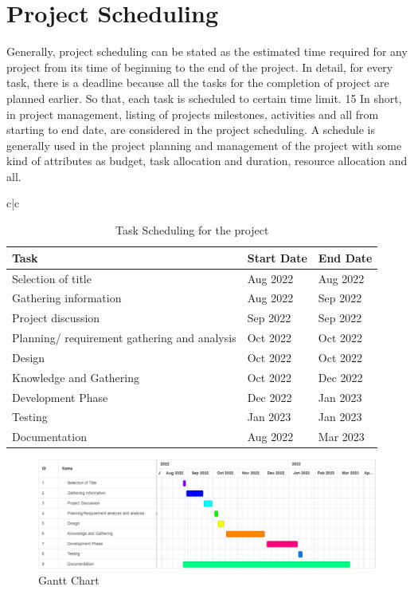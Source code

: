 \section{Project Scheduling}
Generally, project scheduling can be stated as the estimated time required for any project from its time of beginning to the end of the project. In detail, for every task, there is a deadline because all the tasks for the completion of project are planned earlier. So that, each task is scheduled to certain time limit.   15 In short, in project management, listing of projects milestones, activities and all from starting to end date, are considered in the project scheduling. A schedule is generally used in the project planning and management of the project with some kind of attributes as budget, task allocation and duration, resource allocation and all.
 \begin{table}[H]
     \centering
     \begin{tabular}{c|c}
         
         \begin{tabularx}{1\textwidth} { 
  | >{\raggedright\arraybackslash}X 
  | >{\raggedright\arraybackslash}X 
  | >{\raggedright\arraybackslash}X|}
 \hline
  Task & Start Date & End Date \\
 \hline
 Selection of title &26 Aug 2022&29 Aug 2022\\
\hline
  Gathering information  &30 Aug 2022&19 Sep 2022\\
\hline
 Project discussion &20 Sep 2022&30 Sep 2022 \\
\hline
  Planning/ requirement gathering and  analysis  &3 Oct 2022&7 Oct 2022 \\
\hline
 Design &7 Oct 2022&14 Oct 2022 \\
\hline
Knowledge and Gathering &17 Oct 2022&2 Dec 2022\\
\hline
Development Phase &5 Dec 2022&11 Jan 2023\\
\hline
Testing &12 Jan 2023&17 Jan 2023\\
\hline
Documentation &26 Aug 2022&15 Mar 2023\\
\hline


\end{tabularx} 
     \end{tabular}
     \caption{Task Scheduling for the project}
     \label{tab:my_label}
 \end{table}
 \begin{figure}[H]
    \centering
    \includegraphics[scale=0.42]{design/Gantt fin.png}
    \caption{Gantt Chart}
    \label{fig:my_label}
\end{figure}    



